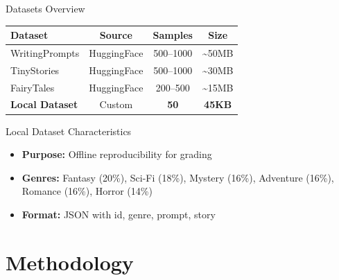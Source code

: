 \documentclass[aspectratio=169]{beamer}
\begin{document}
\begin{frame}{Datasets Overview}
    \begin{table}
        \centering
        \small
        \begin{tabular}{lccc}
            \toprule
            \textbf{Dataset} & \textbf{Source} & \textbf{Samples} & \textbf{Size} \\
            \midrule
            WritingPrompts & HuggingFace & 500--1000 & \textasciitilde50MB \\
            TinyStories & HuggingFace & 500--1000 & \textasciitilde30MB \\
            FairyTales & HuggingFace & 200--500 & \textasciitilde15MB \\
            \textbf{Local Dataset} & Custom & \textbf{50} & \textbf{45KB} \\
            \bottomrule
        \end{tabular}
    \end{table}
    
    \vspace{0.5cm}
    
    \begin{block}{Local Dataset Characteristics}
        \begin{itemize}
            \item \textbf{Purpose:} Offline reproducibility for grading
            \item \textbf{Genres:} Fantasy (20\%), Sci-Fi (18\%), Mystery (16\%), Adventure (16\%), Romance (16\%), Horror (14\%)
            \item \textbf{Format:} JSON with id, genre, prompt, story
        \end{itemize}
    \end{block}
\end{frame}

\section{Methodology}
\end{document}
